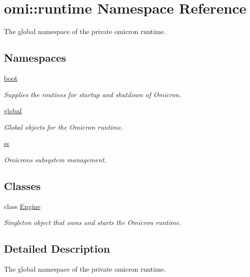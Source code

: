 \hypertarget{namespaceomi_1_1runtime}{}\section{omi\+:\+:runtime Namespace Reference}
\label{namespaceomi_1_1runtime}


The global namespace of the private omicron runtime.  


\subsection*{Namespaces}
\begin{DoxyCompactItemize}
\item 
 \hyperlink{namespaceomi_1_1runtime_1_1boot}{boot}
\begin{DoxyCompactList}\small\item\em Supplies the routines for startup and shutdown of Omicron. \end{DoxyCompactList}\item 
 \hyperlink{namespaceomi_1_1runtime_1_1global}{global}
\begin{DoxyCompactList}\small\item\em Global objects for the Omicron runtime. \end{DoxyCompactList}\item 
 \hyperlink{namespaceomi_1_1runtime_1_1ss}{ss}
\begin{DoxyCompactList}\small\item\em Omicron\textquotesingle{}s subsystem management. \end{DoxyCompactList}\end{DoxyCompactItemize}
\subsection*{Classes}
\begin{DoxyCompactItemize}
\item 
class \hyperlink{classomi_1_1runtime_1_1_engine}{Engine}
\begin{DoxyCompactList}\small\item\em Singleton object that owns and starts the Omicron runtime. \end{DoxyCompactList}\end{DoxyCompactItemize}


\subsection{Detailed Description}
The global namespace of the private omicron runtime. 